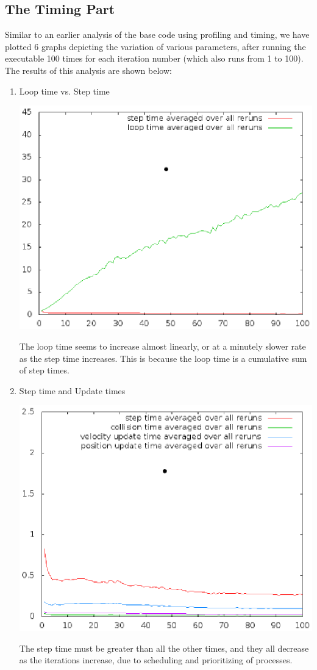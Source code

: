 \documentclass[a4paper,11pt]{article}
\begin{document}
\subsection*{The Timing Part}
Similar to an earlier analysis of the base code using profiling and timing, we have plotted 6 graphs depicting the variation of various parameters, after running the executable 100 times for each iteration number (which also runs from 1 to 100). The results of this analysis are shown below:
\\
\begin{enumerate}
  \item Loop time vs. Step time
  \begin{center}
  \includegraphics{doc/g09_plot01.eps}
  \end{center}
  The loop time seems to increase almost linearly, or at a minutely slower rate as the step time increases. This is because the loop time is a cumulative sum of step times.

  \item Step time and Update times
  \begin{center}
  \includegraphics{doc/g09_plot02.eps}
  \end{center}
  The step time must be greater than all the other times, and they all decrease as the iterations increase, due to scheduling and prioritizing of processes.
  

\end{enumerate}
\end{document}
